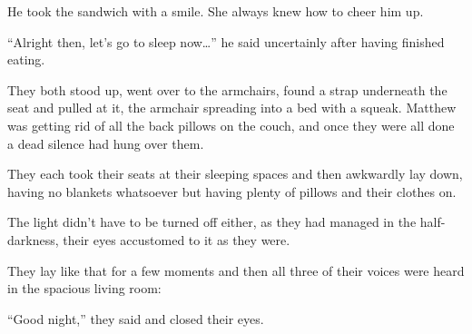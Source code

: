 He took the sandwich with a smile. She always knew how to cheer him up.

“Alright then, let’s go to sleep now…” he said uncertainly after having finished eating.

They both stood up, went over to the armchairs, found a strap underneath the seat and pulled at it, the armchair spreading into a bed with a squeak. Matthew was getting rid of all the back pillows on the couch, and once they were all done a dead silence had hung over them.

They each took their seats at their sleeping spaces and then awkwardly lay down, having no blankets whatsoever but having plenty of pillows and their clothes on.

The light didn’t have to be turned off either, as they had managed in the half-darkness, their eyes accustomed to it as they were.

They lay like that for a few moments and then all three of their voices were heard in the spacious living room:

“Good night,” they said and closed their eyes.
